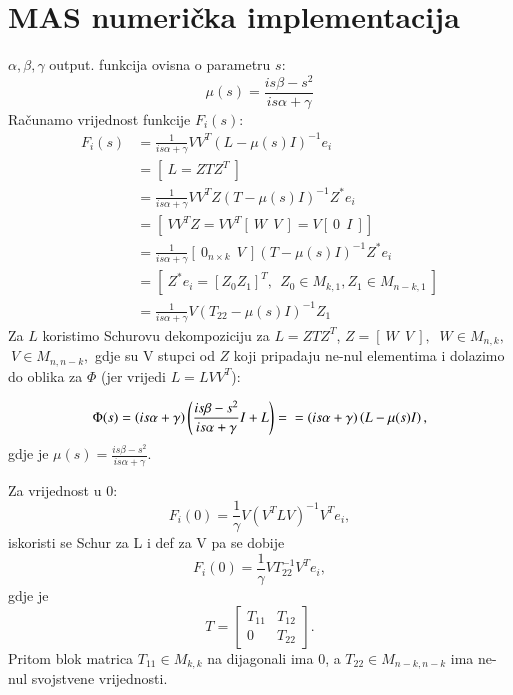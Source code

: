 \section[MAS numerička implementacija][MAS numerička implementacija]{MAS numerička implementacija}
 $\alpha, \beta, \gamma$
output. funkcija ovisna o parametru $s$:  $$\mu(s)=\frac{is\beta -s^2}{is \alpha + \gamma} $$Računamo 
vrijednost funkcije $F_i(s)$:
\begin{align*}
         F_i(s)  & = \frac{1}{is\alpha + \gamma}VV^T(L-\mu(s)I)^{-1}e_i \\
         & = \left[\: L = ZTZ^T \: \right]\\
         & = \frac{1}{is\alpha + \gamma}VV^TZ(T-\mu(s)I)^{-1}Z^*e_i  \\
         & = \left[ \: VV^TZ = VV^T[\:W \:\: V \:] = V \left[\:0 \: \: I\: \right]  \right] \\
         & = \frac{1}{is\alpha + \gamma}\left[\:0_{n×k} \:\: V \:\right](T-\mu(s)I)^{-1}Z^*e_i\\
         & = \left[\: Z^*e_i = [Z_0 Z_1]^T, \: \: Z_0 \in M_{k,1}, Z_1 \in M_{n-k,1}\: \right]\\
         & = \frac{1}{is\alpha + \gamma} V (T_{22} - \mu(s)I)^{-1} Z_1
\end{align*}
Za $L$ koristimo Schurovu dekompoziciju za $L= ZTZ^T$, $Z= [\: W\:\: V\:],$ $ \: W \in M_{n,k},$ $ \: V \in M_{n,n-k},$ gdje su V stupci od $Z$ koji pripadaju ne-nul elementima i dolazimo do oblika za $\Phi$ (jer vrijedi $L = L V V^T$):

$$\Phi(s) = \left(is \alpha + \gamma \right)\left(\frac{is\beta -s^2}{is \alpha + \gamma}I +L\right) = \\ =  (is \alpha + \gamma)\left(L - \mu(s)I\right),$$
gdje je $\mu(s) =\frac{is\beta -s^2}{is \alpha + \gamma} $.

Za vrijednost u $0$:
$$F_i(0) = \frac{1}{\gamma}V(V^TLV)^{-1}V^Te_i,$$ iskoristi se Schur za L i def za V pa se dobije
$$F_i(0) = \frac{1}{\gamma}VT_{22}^{-1}V^Te_i, $$
gdje je $$ T = 
\begin{bmatrix}
  T_{11} & T_{12}\\
  0 & T_{22}
  \end{bmatrix}.
$$ Pritom blok matrica $T_{11} \in M_{k,k}$ na dijagonali ima $0$, a $T_{22} \in M_{n-k,n-k}$ ima ne-nul svojstvene vrijednosti.


